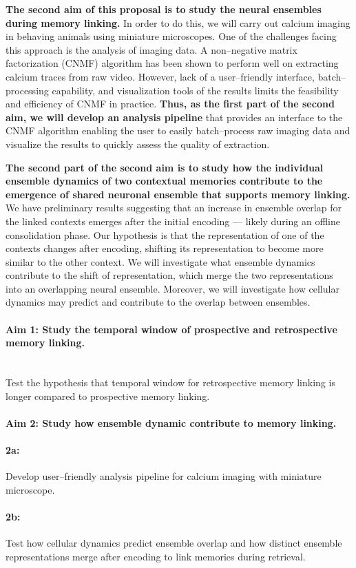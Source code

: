 \documentclass[master.tex]{subfiles}
\begin{document}
\textbf{The second aim of this proposal is to study the neural ensembles during
  memory linking.} In order to do this, we will carry out calcium imaging in
behaving animals using miniature microscopes. One of the challenges facing this
approach is the analysis of imaging data. A non--negative matrix factorization
(CNMF) algorithm has been shown to perform well on extracting calcium traces
from raw video. However, lack of a user--friendly interface, batch--processing
capability, and visualization tools of the results limits the feasibility and
efficiency of CNMF in practice. \textbf{Thus, as the first part of the second
  aim, we will develop an analysis pipeline} that provides an interface to the
CNMF algorithm enabling the user to easily batch--process raw imaging data and
visualize the results to quickly assess the quality of extraction.

\textbf{The second part of the second aim is to study how the individual
  ensemble dynamics of two contextual memories contribute to the emergence of
  shared neuronal ensemble that supports memory linking.} We have preliminary
results suggesting that an increase in ensemble overlap for the linked contexts
emerges after the initial encoding --- likely during an offline consolidation
phase. Our hypothesis is that the representation of one of the contexts changes
after encoding, shifting its representation to become more similar to the other
context. We will investigate what ensemble dynamics contribute to the shift of
representation, which merge the two representations into an overlapping neural
ensemble. Moreover, we will investigate how cellular dynamics may predict and
contribute to the overlap between ensembles.

\paragraph{Aim 1: Study the temporal window of prospective and retrospective
  memory linking.}\mbox{}\\
Test the hypothesis that temporal window for retrospective memory linking is
longer compared to prospective memory linking.

\paragraph{Aim 2: Study how ensemble dynamic contribute to memory linking.}

\paragraph{2a:}Develop user--friendly analysis pipeline for calcium imaging with
miniature microscope.

\paragraph{2b:}Test how cellular dynamics predict ensemble overlap and how
distinct ensemble representations merge after encoding to link memories during
retrieval.

\newpage
\end{document}
